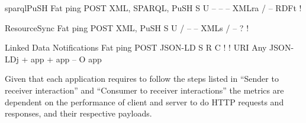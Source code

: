 \documentclass[a4paper]{llncs}
\begin{document}
                                                sparqlPuSH
                                                Fat ping
                                                POST
                                                XML, SPARQL, PuSH
                                                S U
                                                –
                                                –
                                                –
                                                XMLra
                                                /
                                                –
                                                RDFt
                                                !


                                                ResourceSync
                                                Fat ping
                                                POST
                                                XML, PuSH
                                                S U
                                                /
                                                –
                                                –
                                                XMLs
                                                /
                                                –
                                                ?
                                                !


                                                Linked Data Notifications
                                                Fat ping
                                                POST
                                                JSON-LD
                                                S R C
                                                !
                                                ! URI
                                                Any
                                                JSON-LDj
                                                + app
                                                + app
                                                –
                                                O app





\par Given that each application requires to follow the steps listed in ``\empty Sender to receiver interaction'' and ``\empty Consumer to receiver interactions'' the metrics are dependent on the performance of client and server to do HTTP requests and responses, and their respective payloads.
\end{document}
